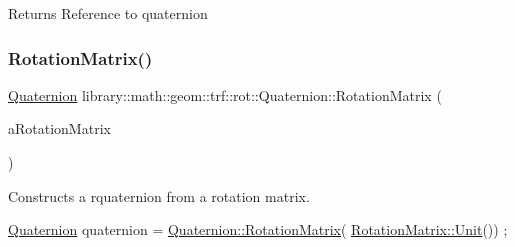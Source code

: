 \begin{DoxyReturn}{Returns}
Reference to quaternion 
\end{DoxyReturn}
\mbox{\label{classlibrary_1_1math_1_1geom_1_1trf_1_1rot_1_1_quaternion_a7e8dbb362e5fe18217724259fde80a03}} 
\subsubsection{\texorpdfstring{Rotation\+Matrix()}{RotationMatrix()}}
{\footnotesize\ttfamily \hyperlink{classlibrary_1_1math_1_1geom_1_1trf_1_1rot_1_1_quaternion}{Quaternion} library\+::math\+::geom\+::trf\+::rot\+::\+Quaternion\+::\+Rotation\+Matrix (\begin{DoxyParamCaption}\item[{const \hyperlink{classlibrary_1_1math_1_1geom_1_1trf_1_1rot_1_1_rotation_matrix}{rot\+::\+Rotation\+Matrix} \&}]{a\+Rotation\+Matrix }\end{DoxyParamCaption})\hspace{0.3cm}{\ttfamily [static]}}



Constructs a rquaternion from a rotation matrix. 


\begin{DoxyCode}
\hyperlink{classlibrary_1_1math_1_1geom_1_1trf_1_1rot_1_1_quaternion_aa7f459a08f5af38b9f7676a6bf36a21c}{Quaternion} quaternion = \hyperlink{classlibrary_1_1math_1_1geom_1_1trf_1_1rot_1_1_quaternion_a7e8dbb362e5fe18217724259fde80a03}{Quaternion::RotationMatrix}(
      \hyperlink{classlibrary_1_1math_1_1geom_1_1trf_1_1rot_1_1_rotation_matrix_aac59b7dafc34767d24d0934f4b86bef0}{RotationMatrix::Unit}()) ;
\end{DoxyCode}




